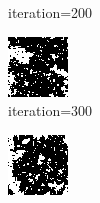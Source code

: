 \documentclass{article}
\begin{document}
\begin{figure}[h]
\begin{subfigure}[t]{0.18\textwidth}
\vspace{-0.6cm}
\caption{iteration=200}
\end{subfigure}\hspace{0.01\textwidth}
\begin{subfigure}[t]{0.18\textwidth}
\centering
\includegraphics[width=\textwidth]{./computational/results/gibbs_node_sampler_negative_iter_300.png}
\vspace{-0.6cm}
\caption{iteration=300}
\end{subfigure}\hspace{0.01\textwidth}
\begin{subfigure}[t]{0.18\textwidth}
\centering
\includegraphics[width=\textwidth]{./computational/results/gibbs_node_sampler_negative_iter_400.png}

\end{subfigure}
\end{figure}
\end{document}
